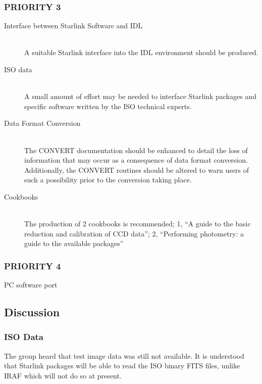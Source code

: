 \subsubsection{PRIORITY 3}

\begin{description}
\item[Interface between Starlink Software and IDL]\mbox{}\\
A suitable Starlink interface into the IDL environment should be
produced.

\item[ISO data]\mbox{}\\
A small amount of effort may be needed to interface Starlink packages
and specific software written by the ISO technical experts.

\item[Data Format Conversion]\mbox{}\\
The CONVERT documentation should be enhanced to detail the loss of
information that may occur as a consequence of data format
conversion. Additionally, the CONVERT routines should be altered to
warn users of such a possibility prior to the conversion taking place.

\item[Cookbooks]\mbox{}\\
The production of 2 cookbooks is recommended; 1, ``A guide to the
basic reduction and calibration of CCD data''; 2, ``Performing
photometry: a guide to the available packages''

\end{description}

\subsubsection{PRIORITY 4}

\begin{description}
\item[PC software port]
\end{description}

\subsection{Discussion}

\subsubsection{ISO Data}

The group heard that test image data was still not available. It is
understood that Starlink packages will be able to read the ISO binary
FITS files, unlike IRAF which will not do so at present.

